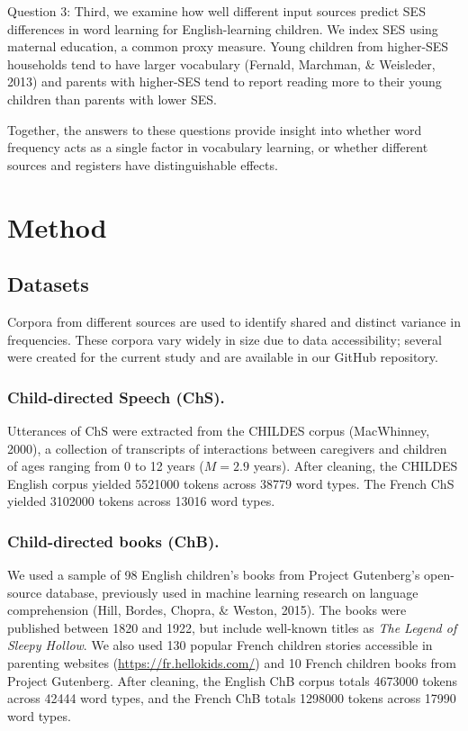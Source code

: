 \documentclass[10pt, letterpaper]{article}
\begin{document}
Question 3: Third, we examine how well different input sources predict
SES differences in word learning for English-learning children. We index
SES using maternal education, a common proxy measure. Young children
from higher-SES households tend to have larger vocabulary (Fernald,
Marchman, \& Weisleder, 2013) and parents with higher-SES tend to report
reading more to their young children than parents with lower SES.

Together, the answers to these questions provide insight into whether
word frequency acts as a single factor in vocabulary learning, or
whether different sources and registers have distinguishable effects.

\hypertarget{method}{%
\section{Method}\label{method}}

\hypertarget{datasets}{%
\subsection{Datasets}\label{datasets}}

Corpora from different sources are used to identify shared and distinct
variance in frequencies. These corpora vary widely in size due to data
accessibility; several were created for the current study and are
available in our GitHub repository.

\hypertarget{child-directed-speech-chs.}{%
\subsubsection{Child-directed Speech
(ChS).}\label{child-directed-speech-chs.}}

Utterances of ChS were extracted from the CHILDES corpus (MacWhinney,
2000), a collection of transcripts of interactions between caregivers
and children of ages ranging from 0 to 12 years (\(M=2.9\) years). After
cleaning, the CHILDES English corpus yielded 5521000 tokens across 38779
word types. The French ChS yielded 3102000 tokens across 13016 word
types.

\hypertarget{child-directed-books-chb.}{%
\subsubsection{Child-directed books
(ChB).}\label{child-directed-books-chb.}}

We used a sample of 98 English children's books from Project Gutenberg's
open-source database, previously used in machine learning research on
language comprehension (Hill, Bordes, Chopra, \& Weston, 2015). The
books were published between 1820 and 1922, but include well-known
titles as \emph{The Legend of Sleepy Hollow}. We also used 130 popular
French children stories accessible in parenting websites
(\url{https://fr.hellokids.com/}) and 10 French children books from
Project Gutenberg. After cleaning, the English ChB corpus totals 4673000
tokens across 42444 word types, and the French ChB totals 1298000 tokens
across 17990 word types.
\end{document}
